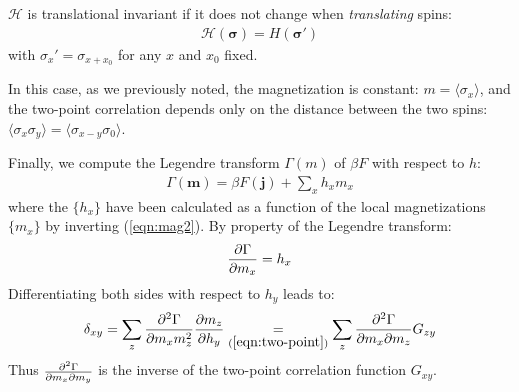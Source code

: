 \documentclass[../../main.tex]{subfiles}
\begin{document}
$\mathcal{H}$ is translational invariant if it does not change when \textit{translating} spins: 
\begin{align*}
    \mathcal{H}(\bm{\sigma}) = H(\bm{\sigma}')
\end{align*}
with $\sigma_x' = \sigma_{x+x_0}$ for any $x$ and $x_0$ fixed.

In this case, as we previously noted, the magnetization is constant: $m = \langle \sigma_x \rangle$, and the two-point correlation depends only on the distance between the two spins: $\langle \sigma_x \sigma_y \rangle = \langle \sigma_{x-y} \sigma_0 \rangle$.

\medskip

Finally, we compute the Legendre transform $\Gamma(m)$ of $\beta F$ with respect to $h$:
\begin{align*}
    \Gamma(\bm{m}) = \beta F(\bm{j}) + \sum_x h_x m_x
\end{align*}
where the $\{h_x\}$ have been calculated as a function of the local magnetizations $\{m_x\}$ by inverting (\ref{eqn:mag2}). By property of the Legendre transform:
\begin{align*}
    \pdv{\Gamma}{m_x} = h_x
\end{align*}
Differentiating both sides with respect to $h_y$ leads to:
\begin{align*}
    \delta_{xy} = \sum_z \pdv[2]{\Gamma}{m_x m_z} \pdv{m_z}{h_y} \underset{(\ref{eqn:two-point})}{=} \sum_z \pdv[2]{\Gamma}{m_x}{m_z} G_{zy}
\end{align*}
Thus $\pdv[2]{\Gamma}{m_x}{m_y}$ is the inverse of the two-point correlation function $G_{xy}$. %
\end{document}
